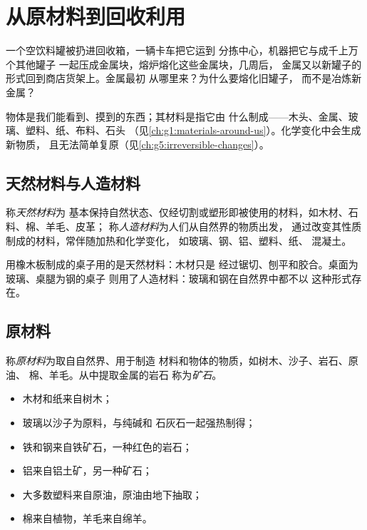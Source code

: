 \chapter{从原材料到回收利用}\label{ch:g5:raw-materials-and-recycling}

一个空饮料罐被扔进回收箱，一辆卡车把它运到
分拣中心，机器把它与成千上万个其他罐子
一起压成金属块，熔炉熔化这些金属块，几周后，
金属又以新罐子的形式回到商店货架上。金属最初
从哪里来？为什么要熔化旧罐子，
而不是冶炼新金属？

\begin{recall}
物体是我们能看到、摸到的东西；其材料是指它由
什么制成——木头、金属、玻璃、塑料、纸、布料、石头
（见\cref{ch:g1:materials-around-us}）。化学变化中会生成新物质，
且无法简单复原（见\cref{ch:g5:irreversible-changes}）。
\end{recall}

\section{天然材料与人造材料}

\begin{definition}[天然材料与人造材料]\label{def:g5:raw-materials-and-recycling:natural-material}
称\emph{天然材料}为
基本保持自然状态、仅经切割或塑形即被使用的材料，如木材、石料、棉、羊毛、皮革；
称\emph{人造材料}为人们从自然界的物质出发，
通过改变其性质制成的材料，常伴随加热和化学变化，
如玻璃、钢、铝、塑料、纸、
混凝土。
\end{definition}

\begin{example}[两张桌子]\label{ex:g5:raw-materials-and-recycling:tables}
用橡木板制成的桌子用的是天然材料：木材只是
经过锯切、刨平和胶合。桌面为玻璃、桌腿为钢的桌子
则用了人造材料：玻璃和钢在自然界中都不以
这种形式存在。
\end{example}

\section{原材料}

\begin{definition}[原材料与矿石]\label{def:g5:raw-materials-and-recycling:raw-material}
称\emph{原材料}为取自自然界、用于制造
材料和物体的物质，如树木、沙子、岩石、原油、
棉、羊毛。从中提取金属的岩石
称为\emph{矿石}。
\end{definition}

\begin{example}[材料从何而来]\label{ex:g5:raw-materials-and-recycling:from}
\begin{itemize}
  \item 木材和纸来自树木；
  \item 玻璃以沙子为原料，与纯碱和
        石灰石一起强热制得；
  \item 铁和钢来自铁矿石，一种红色的岩石；
  \item 铝来自铝土矿，另一种矿石；
  \item 大多数塑料来自原油，原油由地下抽取；
  \item 棉来自植物，羊毛来自绵羊。
\end{itemize}
\end{example}

